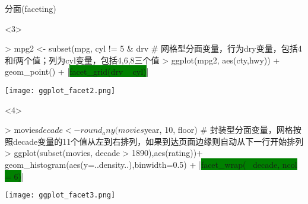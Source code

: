 \begin{frame}[t,fragile]{\subsecname}{分面(faceting)}
\begin{overlayarea}{\textwidth}{\textheight}
\begin{onlyenv}<3>
\begin{minipage}{\textwidth}
\begin{rcode}
> mpg2 <- subset(mpg, cyl != 5 & drv %
# 网格型分面变量，行为dry变量，包括4和f两个值；列为cyl变量，包括4,6,8三个值
> ggplot(mpg2, aes(cty,hwy)) + geom_point() + |\colorbox{green}{facet\_grid(drv ~ cyl)}|
\end{rcode}
\end{minipage}
\begin{minipage}{\textwidth}
\centering
\texttt{[image: ggplot\_facet2.png]}
\end{minipage}
\end{onlyenv}

\begin{onlyenv}<4>
\begin{minipage}{\textwidth}
\begin{rcode}
> movies$decade <- round_any(movies$year, 10, floor)
# 封装型分面变量，网格按照decade变量的11个值从左到右排列，如果到达页面边缘则自动从下一行开始排列
> ggplot(subset(movies, decade > 1890),aes(rating))+
     geom_histogram(aes(y=..density..),binwidth=0.5) + 
     |\colorbox{green}{facet\_wrap(~ decade, ncol = 6)}|
\end{rcode}
\end{minipage}
\begin{minipage}{\textwidth}
\centering
\texttt{[image: ggplot\_facet3.png]}
\end{minipage}
\end{onlyenv}



\end{overlayarea}
\end{frame}
